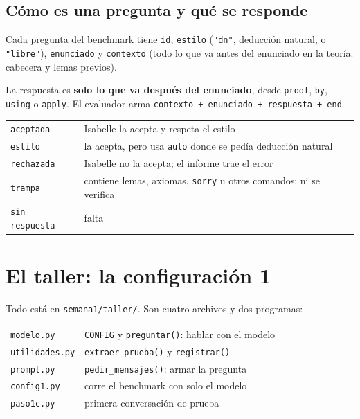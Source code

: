 \documentclass[11pt,a4paper]{article}
\newcommand{\cd}[1]{\texttt{\small #1}}
\begin{document}
\subsection{Cómo es una pregunta y qué se responde}
Cada pregunta del benchmark tiene \cd{id}, \cd{estilo} (\cd{"dn"},
deducción natural, o \cd{"libre"}), \cd{enunciado} y \cd{contexto} (todo
lo que va antes del enunciado en la teoría: cabecera y lemas previos).

La respuesta es \textbf{solo lo que va después del enunciado}, desde
\cd{proof}, \cd{by}, \cd{using} o \cd{apply}. El evaluador arma
\cd{contexto + enunciado + respuesta + end}.

\begin{center}
\small
\begin{tabular}{@{}ll@{}}
  \toprule
  \cd{aceptada} & Isabelle la acepta y respeta el estilo \\
  \cd{estilo} & la acepta, pero usa \cd{auto} donde se pedía deducción natural \\
  \cd{rechazada} & Isabelle no la acepta; el informe trae el error \\
  \cd{trampa} & contiene lemas, axiomas, \cd{sorry} u otros comandos: ni se verifica \\
  \cd{sin respuesta} & falta \\
  \bottomrule
\end{tabular}
\end{center}

\section{El taller: la configuración 1}

Todo está en \cd{semana1/taller/}. Son cuatro archivos y dos programas:

\begin{center}
\small
\begin{tabular}{@{}ll@{}}
  \toprule
  \cd{modelo.py} & \cd{CONFIG} y \cd{preguntar()}: hablar con el modelo \\
  \cd{utilidades.py} & \cd{extraer\_prueba()} y \cd{registrar()} \\
  \cd{prompt.py} & \cd{pedir\_mensajes()}: armar la pregunta \\
  \cd{config1.py} & corre el benchmark con solo el modelo \\
  \cd{paso1c.py} & primera conversación de prueba \\
  \bottomrule
\end{tabular}
\end{center}
\end{document}
